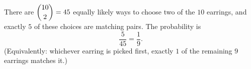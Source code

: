There are $\dbinom{10}{2}=45$ equally likely ways to choose two of the $10$ earrings, and exactly $5$ of these choices are matching pairs. The probability is
\[
\dfrac{5}{45}=\boxed{\dfrac{1}{9}}.
\]
(Equivalently: whichever earring is picked first, exactly $1$ of the remaining $9$ earrings matches it.)
